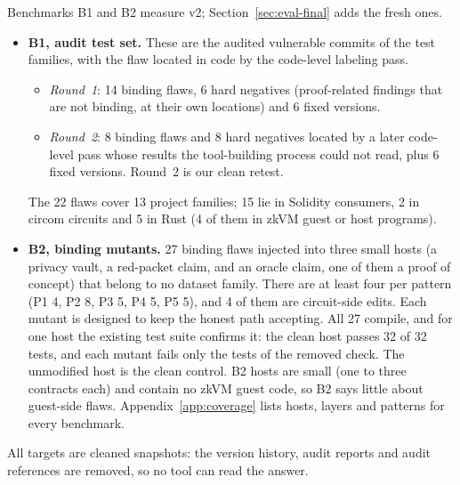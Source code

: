 Benchmarks B1 and B2 measure v2; Section~\ref{sec:eval-final} adds the fresh
ones.
\begin{itemize}
\item \textbf{B1, audit test set.} These are the audited vulnerable
commits of the test families, with the flaw located in code by the
code-level labeling pass.
  \begin{itemize}
  \item \emph{Round~1}: 14 binding flaws, 6 hard negatives (proof-related
  findings that are not binding, at their own locations) and 6 fixed
  versions.
  \item \emph{Round~2}: 8 binding flaws and 8 hard negatives located by a
  later code-level pass whose results the tool-building process could not
  read, plus 6 fixed versions. Round~2 is our clean retest.
  \end{itemize}
  The 22 flaws cover 13 project families; 15 lie in Solidity consumers, 2 in
  circom circuits and 5 in Rust (4 of them in zkVM guest or host programs).
\item \textbf{B2, binding mutants.} 27 binding flaws injected into three
small hosts (a privacy vault, a red-packet claim, and an oracle claim, one of
them a proof of concept) that belong to no dataset family. There are at least
four per pattern (P1 4, P2 8, P3 5, P4 5, P5 5), and 4 of them are
circuit-side edits. Each mutant is designed to keep the honest path
accepting. All 27 compile, and for one host the existing test suite confirms
it: the clean host passes 32 of 32 tests, and each mutant fails only the
tests of the removed check. The unmodified host is the clean control.
B2 hosts are small (one to three contracts each) and contain no zkVM guest
code, so B2 says little about guest-side flaws. Appendix~\ref{app:coverage}
lists hosts, layers and patterns for every benchmark.
\end{itemize}
All targets are cleaned snapshots: the version history, audit reports and
audit references are removed, so no tool can read the answer.


